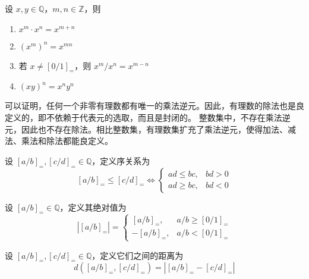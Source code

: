\begin{theorem}
    设 $x,y\in\mathbb{Q}$，$m,n\in\mathbb{Z}$，则
    \begin{enumerate}
        \item $x^m \cdot x^n = x^{m+n}$
        \item $(x^m)^n = x^{mn}$
        \item 若 $x\neq [0/1]_{=}$，则 $x^m / x^n = x^{m-n}$
        \item $(xy)^n = x^n y^n$
    \end{enumerate}
\end{theorem}

\vspace{1em}

\begin{note}
    可以证明，任何一个非零有理数都有唯一的乘法逆元。因此，有理数的除法也是良定义的，即不依赖于代表元的选取，而且是封闭的。
    整数集中，不存在乘法逆元，因此也不存在除法。相比整数集，有理数集扩充了乘法逆元，使得加法、减法、乘法和除法都能良定义。
\end{note}

\vspace{1em}

\begin{definition}
    设 $[a/b]_{=},[c/d]_{=}\in\mathbb{Q}$，定义序关系为
    \[
        [a/b]_{=} \leq [c/d]_{=} \iff 
        \begin{cases}
            ad \leq bc, & bd > 0 \\
            ad \geq bc, & bd < 0
        \end{cases}
    \]
\end{definition}

\begin{definition}
    设 $[a/b]_{=}\in\mathbb{Q}$，定义其绝对值为
    \[
        |[a/b]_{=}| = 
        \begin{cases}
            [a/b]_{=}, & a/b \geq [0/1]_{=} \\
            -[a/b]_{=}, & a/b < [0/1]_{=}
        \end{cases}
    \]
\end{definition}

\begin{definition}
    设 $[a/b]_{=},[c/d]_{=}\in\mathbb{Q}$，定义它们之间的距离为
    \[
        d([a/b]_{=},[c/d]_{=}) = |[a/b]_{=} - [c/d]_{=}|
    \]
\end{definition}

